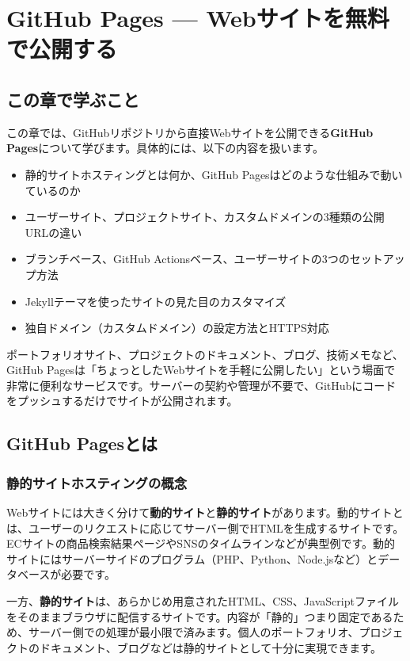 \chapter{GitHub Pages --- Webサイトを無料で公開する}

\section{この章で学ぶこと}

この章では、GitHubリポジトリから直接Webサイトを公開できる\textbf{GitHub Pages}について学びます。具体的には、以下の内容を扱います。

\begin{itemize}
  \item 静的サイトホスティングとは何か、GitHub Pagesはどのような仕組みで動いているのか
  \item ユーザーサイト、プロジェクトサイト、カスタムドメインの3種類の公開URLの違い
  \item ブランチベース、GitHub Actionsベース、ユーザーサイトの3つのセットアップ方法
  \item Jekyllテーマを使ったサイトの見た目のカスタマイズ
  \item 独自ドメイン（カスタムドメイン）の設定方法とHTTPS対応
\end{itemize}

ポートフォリオサイト、プロジェクトのドキュメント、ブログ、技術メモなど、GitHub Pagesは「ちょっとしたWebサイトを手軽に公開したい」という場面で非常に便利なサービスです。サーバーの契約や管理が不要で、GitHubにコードをプッシュするだけでサイトが公開されます。

\section{GitHub Pagesとは}

\subsection{静的サイトホスティングの概念}

Webサイトには大きく分けて\textbf{動的サイト}と\textbf{静的サイト}があります。動的サイトとは、ユーザーのリクエストに応じてサーバー側でHTMLを生成するサイトです。ECサイトの商品検索結果ページやSNSのタイムラインなどが典型例です。動的サイトにはサーバーサイドのプログラム（PHP、Python、Node.jsなど）とデータベースが必要です。

一方、\textbf{静的サイト}は、あらかじめ用意されたHTML、CSS、JavaScriptファイルをそのままブラウザに配信するサイトです。内容が「静的」つまり固定であるため、サーバー側での処理が最小限で済みます。個人のポートフォリオ、プロジェクトのドキュメント、ブログなどは静的サイトとして十分に実現できます。

